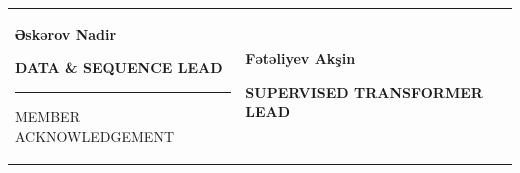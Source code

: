 \documentclass[10pt,a4paper]{article}
\begin{document}
\begin{tabularx}{\textwidth}{
    >{\centering\arraybackslash}X
    >{\centering\arraybackslash}X
}


\begin{minipage}[t]{0.43\textwidth}
\centering

{\color{darkgreen}
\setlength{\fboxsep}{8pt}
\setlength{\fboxrule}{0.8pt}
\fbox{
    \begin{minipage}[c][0.8cm][c]{0.8cm}
    \centering
    {\Large\bfseries\azfont ƏN}
    \end{minipage}
}
}

\vspace{8pt}

{\large\bfseries\azfont Əskərov Nadir}

\vspace{2pt}

{\footnotesize\bfseries\color{darkgreen}
DATA \& SEQUENCE LEAD}

\vspace{9pt}

{\color{darkgreen}
\rule{0.70\linewidth}{0.7pt}}

\vspace{2pt}

{\scriptsize\color{signaturegray}
MEMBER ACKNOWLEDGEMENT}

\end{minipage}

&

\begin{minipage}[t]{0.43\textwidth}
\centering

{\color{darkgreen}
\setlength{\fboxsep}{8pt}
\setlength{\fboxrule}{0.8pt}
\fbox{
    \begin{minipage}[c][0.8cm][c]{0.8cm}
    \centering
    {\Large\bfseries\azfont FA}
    \end{minipage}
}
}

\vspace{8pt}

{\large\bfseries\azfont Fətəliyev Akşin}

\vspace{2pt}

{\footnotesize\bfseries\color{darkgreen}
SUPERVISED TRANSFORMER LEAD}

\vspace{9pt}


\end{minipage}
\end{tabularx}
\end{document}
